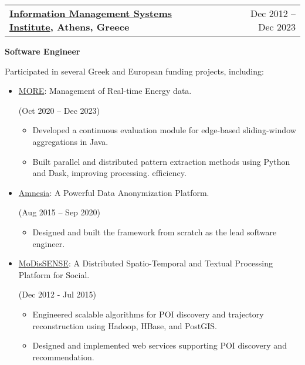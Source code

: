 \documentclass[a4paper,12pt]{article}
\makeatletter
\newenvironment{job}[2]
{
	\begin{tabularx}{\linewidth}{@{}l X r@{}}
		\small
		\textbf{#1} & \hfill &  #2 \\[3.75pt]
	\end{tabularx}
	\begin{minipage}[t]{\linewidth}
		\footnotesize
		\setlength{\parskip}{3pt} %
		\setlength{\parindent}{0pt} %
	}
	{
	\end{minipage}    
}
\makeatother
\begin{document}
\begin{job}{\href{https://www.imsi.athenarc.gr/en}{Information Management Systems Institute}, Athens, Greece}{Dec 2012 – Dec 2023}
\textbf{Software Engineer}

Participated in several Greek and European funding projects, including:
	\begin{itemize}
		
		\item \href{https://www.more2020.eu/}{MORE}: Management of Real-time Energy data.
		
		(Oct 2020 – Dec 2023)		
		\begin{itemize}
			\item Developed a continuous evaluation module for edge-based sliding-window aggregations in Java.
			\item Built parallel and distributed pattern extraction methods using Python and Dask, improving processing. efficiency.
		\end{itemize}
		
		\vspace{-1\baselineskip}
		
		
		\item \href{https://amnesia.openaire.eu/}{Amnesia}: A Powerful Data Anonymization Platform.
		
		(Aug 2015 – Sep 2020)
		\begin{itemize}
			\item Designed and built the framework from scratch as the lead software engineer.
			
		\end{itemize}
		
		\vspace{-1\baselineskip}
		
		\item \href{http://www.modissense.gr/}{MoDisSENSE}: A Distributed Spatio-Temporal and Textual Processing Platform for Social.
		
		(Dec 2012 - Jul 2015)
		\begin{itemize}
			\item Engineered scalable algorithms for POI discovery and trajectory reconstruction using Hadoop, HBase, and PostGIS.
			\item Designed and implemented web services supporting POI discovery and recommendation.
			
		\end{itemize}
		
	\end{itemize}
\end{job}
\end{document}
